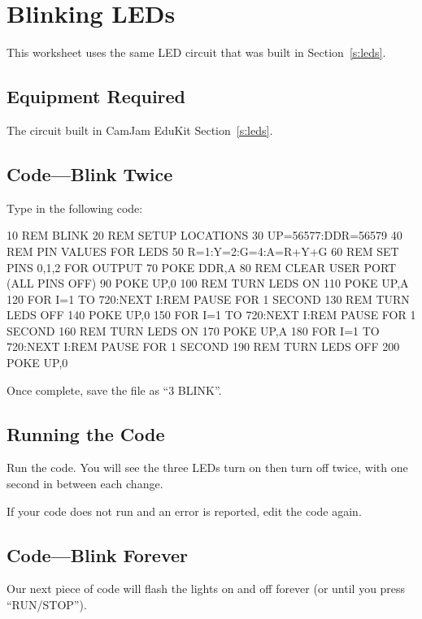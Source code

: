\section{Blinking LEDs}


This worksheet uses the same LED circuit that was built in Section~\ref{s:leds}.

\subsection*{Equipment Required}

The circuit built in CamJam EduKit Section~\ref{s:leds}.

\subsection*{Code---Blink Twice}

Type in the following code:
\begin{basic}
10 REM BLINK
20 REM SETUP LOCATIONS
30 UP=56577:DDR=56579
40 REM PIN VALUES FOR LEDS
50 R=1:Y=2:G=4:A=R+Y+G
60 REM SET PINS 0,1,2 FOR OUTPUT
70 POKE DDR,A
80 REM CLEAR USER PORT (ALL PINS OFF)
90 POKE UP,0
100 REM TURN LEDS ON
110 POKE UP,A
120 FOR I=1 TO 720:NEXT I:REM PAUSE FOR 1 SECOND
130 REM TURN LEDS OFF
140 POKE UP,0
150 FOR I=1 TO 720:NEXT I:REM PAUSE FOR 1 SECOND
160 REM TURN LEDS ON
170 POKE UP,A
180 FOR I=1 TO 720:NEXT I:REM PAUSE FOR 1 SECOND
190 REM TURN LEDS OFF
200 POKE UP,0
\end{basic}

Once complete, save the file as ``3 BLINK''.

\subsection*{Running the Code}

Run the code.  You will see the three LEDs turn on then turn off twice, with one second in between each change.

If your code does not run and an error is reported, edit the code again.

\subsection*{Code---Blink Forever}

Our next piece of code will flash the lights on and off forever (or until you press ``RUN/STOP'').

